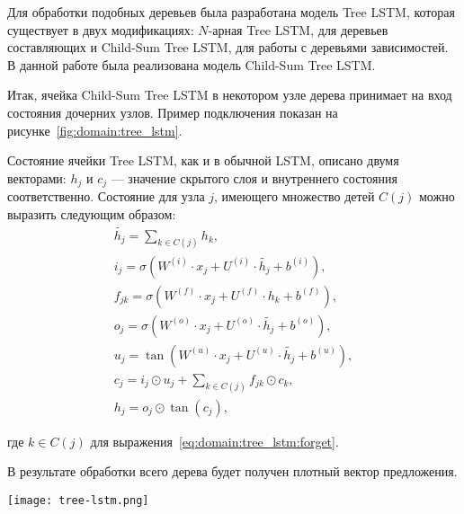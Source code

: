 Для обработки подобных деревьев была разработана модель Tree LSTM, которая существует в двух модификациях: $N$-арная Tree LSTM, для деревьев составляющих и Child-Sum Tree LSTM, для работы с деревьями зависимостей. В данной работе была реализована модель Child-Sum Tree LSTM\cite{tree_lstm}.

Итак, ячейка Child-Sum Tree LSTM в некотором узле дерева принимает на вход состояния дочерних узлов. Пример подключения показан на рисунке~\ref{fig:domain:tree_lstm}.

Состояние ячейки Tree LSTM, как и в обычной LSTM, описано двумя векторами: $h_j$ и $c_j$ --- значение скрытого слоя и внутреннего состояния соответственно. Состояние для узла $j$, имеющего множество детей $C(j)$ можно выразить следующим образом:
\begin{gather}
  \tilde{h_j} = \sum_{k\in{C(j)}}h_k,\\
  \label{eq:domain:tree_lstm:i}
  i_j = \sigma(W^{(i)}\cdot{x_j} + U^{(i)}\cdot{\tilde{h_j}} + b^{(i)}),\\
  \label{eq:domain:tree_lstm:forget}
  f_{jk} = \sigma(W^{(f)}\cdot{x_j} + U^{(f)}\cdot{h_k} + b^{(f)}),\\
  \label{eq:domain:tree_lstm:o}
  o_j = \sigma(W^{(o)}\cdot{x_j} + U^{(o)}\cdot{\tilde{h_j}} + b^{(o)}),\\
  \label{eq:domain:tree_lstm:u}
  u_j = \tan(W^{(u)}\cdot{x_j} + U^{(u)}\cdot{\tilde{h_j}} + b^{(u)}),\\
  c_j = i_j\odot{u_j} + \sum_{k\in{C(j)}}f_{jk}\odot{c_k},\\
  h_j = o_j\odot{\tan(c_j)},
\end{gather}
\begin{explanationx}
\item [где] $k\in{C(j)}$ для выражения~\ref{eq:domain:tree_lstm:forget}.
\end{explanationx}

В результате обработки всего дерева будет получен плотный вектор предложения.

\begin{center}
  \texttt{[image: tree-lstm.png]}
  \label{fig:domain:tree_lstm}
\end{center}


